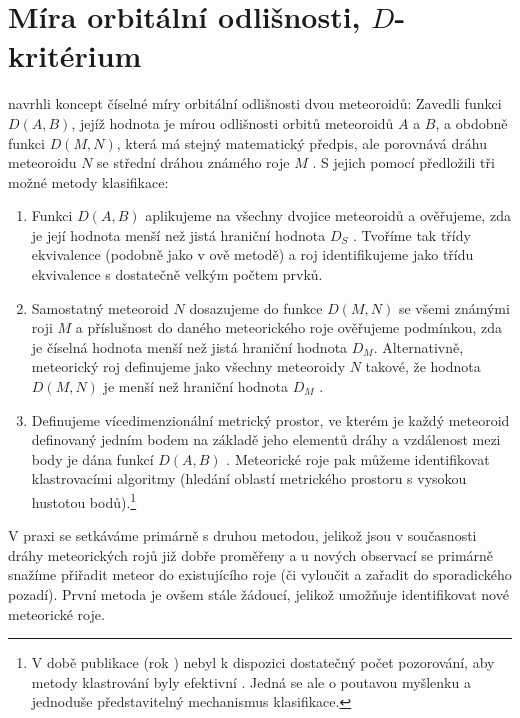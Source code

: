 \section{Míra orbitální odlišnosti, $D$-kritérium}%
\citeauthor{dsh} navrhli koncept číselné míry orbitální odlišnosti dvou meteoroidů: Zavedli funkci $D(A,B)$, jejíž hodnota je mírou odlišnosti orbitů meteoroidů $A$ a $B$, a obdobně funkci $D(M,N)$, která má stejný matematický předpis, ale porovnává dráhu meteoroidu $N$ se střední dráhou známého roje $M$ \cite{dsh}. S jejich pomocí předložili tři možné metody klasifikace:
\begin{enumerate}
    \item Funkci $D(A,B)$ aplikujeme na všechny dvojice meteoroidů a ověřujeme, zda je její hodnota menší než jistá hraniční hodnota $D_S$ \cite{dsh}. Tvoříme tak třídy ekvivalence (podobně jako v \citeauthor{radiosurvey}ově metodě) a roj identifikujeme jako třídu ekvivalence s dostatečně velkým počtem prvků.
    \item Samostatný meteoroid $N$ dosazujeme do funkce $D(M,N)$ se všemi známými roji $M$ a příslušnost do daného meteorického roje ověřujeme podmínkou, zda je číselná hodnota menší než jistá hraniční hodnota $D_M$. Alternativně, meteorický roj definujeme jako všechny meteoroidy $N$ takové, že hodnota $D(M,N)$ je menší než hraniční hodnota $D_M$ \cite{dsh}.
    \item Definujeme vícedimenzionální metrický prostor, ve kterém je každý meteoroid definovaný jedním bodem na základě jeho elementů dráhy a vzdálenost mezi body je dána funkcí $D(A,B)$ \cite{dsh}. Meteorické roje pak můžeme identifikovat klastrovacími algoritmy (hledání oblastí metrického prostoru s vysokou hustotou bodů).\footnote{V době publikace \cite{dsh} (rok \citeyear{dsh}) nebyl k dispozici dostatečný počet pozorování, aby metody klastrování byly efektivní \cite{dsh}. Jedná se ale o poutavou myšlenku a jednoduše představitelný mechanismus klasifikace.}
\end{enumerate}

V praxi se setkáváme primárně s druhou metodou, jelikož jsou v současnosti dráhy meteorických rojů již dobře proměřeny a u nových observací se primárně snažíme přiřadit meteor do existujícího roje (či vyloučit a zařadit do sporadického pozadí). První metoda je ovšem stále žádoucí, jelikož umožňuje identifikovat nové meteorické roje.

